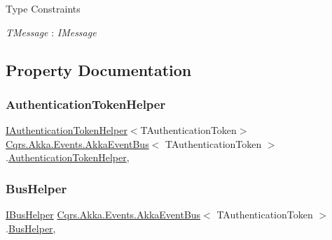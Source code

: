\begin{Desc}
\item[Type Constraints]\begin{description}
\item[{\em T\+Message} : {\em I\+Message}]\end{description}
\end{Desc}


\subsection{Property Documentation}
\mbox{\label{classCqrs_1_1Akka_1_1Events_1_1AkkaEventBus_a03166dfca723430ae548e833a2262632}} 
\subsubsection{\texorpdfstring{Authentication\+Token\+Helper}{AuthenticationTokenHelper}}
{\footnotesize\ttfamily \hyperlink{interfaceCqrs_1_1Authentication_1_1IAuthenticationTokenHelper}{I\+Authentication\+Token\+Helper}$<$T\+Authentication\+Token$>$ \hyperlink{classCqrs_1_1Akka_1_1Events_1_1AkkaEventBus}{Cqrs.\+Akka.\+Events.\+Akka\+Event\+Bus}$<$ T\+Authentication\+Token $>$.\hyperlink{classCqrs_1_1Authentication_1_1AuthenticationTokenHelper}{Authentication\+Token\+Helper}\hspace{0.3cm}{\ttfamily [get]}, {\ttfamily [protected]}}

\mbox{\label{classCqrs_1_1Akka_1_1Events_1_1AkkaEventBus_a04311f852422c212c4dfa35e8cc21e2e}} 
\subsubsection{\texorpdfstring{Bus\+Helper}{BusHelper}}
{\footnotesize\ttfamily \hyperlink{interfaceCqrs_1_1Bus_1_1IBusHelper}{I\+Bus\+Helper} \hyperlink{classCqrs_1_1Akka_1_1Events_1_1AkkaEventBus}{Cqrs.\+Akka.\+Events.\+Akka\+Event\+Bus}$<$ T\+Authentication\+Token $>$.\hyperlink{classCqrs_1_1Bus_1_1BusHelper}{Bus\+Helper}\hspace{0.3cm}{\ttfamily [get]}, {\ttfamily [protected]}}


